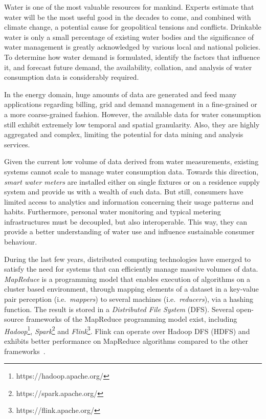 Water is one of the most valuable resources for mankind. Experts estimate that water will be the most useful good in the decades to come, and combined with climate change, a potential cause for geopolitical tensions and conflicts. Drinkable water is only a small percentage of existing water bodies and the significance of water management is greatly acknowledged by various local and national policies. To determine how water demand is formulated, identify the factors that influence it, and forecast future demand, the availability, collation, and analysis of water consumption data is considerably required.

In the energy domain, huge amounts of data are generated and feed many applications regarding billing, grid and demand management in a fine-grained or a more coarse-grained fashion. However, the available data for water consumption still exhibit extremely low temporal and spatial granularity. Also, they are highly aggregated and complex, limiting the potential for data mining and analysis services.

Given the current low volume of data derived from water measurements, existing systems cannot scale to manage water consumption data. Towards this direction, \textit{smart water meters} are installed either on single fixtures or on a residence supply system and provide us with a wealth of such data. But still, consumers have limited access to analytics and information concerning their usage patterns and habits. Furthermore, personal water monitoring and typical metering infrastructures must be decoupled, but also interoperable. This way, they can provide a better understanding of water use and influence sustainable consumer behaviour.

During the last few years, distributed computing technologies have emerged to satisfy the need for systems that can efficiently manage massive volumes of data. \textit{MapReduce} is a programming model that enables execution of algorithms on a cluster based environment, through mapping elements of a dataset in a key-value pair perception (i.e.~\textit{mappers}) to several machines (i.e.~\textit{reducers}), via a hashing function. The result is stored in a \textit{Distributed File System} (DFS). Several open-source frameworks of the MapReduce programming model exist, including \textit{Hadoop}\footnote{https://hadoop.apache.org/}, \textit{Spark}\footnote{https://spark.apache.org/} and \textit{Flink}\footnote{https://flink.apache.org/}. Flink can operate over Hadoop DFS (HDFS) and exhibits better performance on MapReduce algorithms compared to the other frameworks~\cite{studybig2014}.

